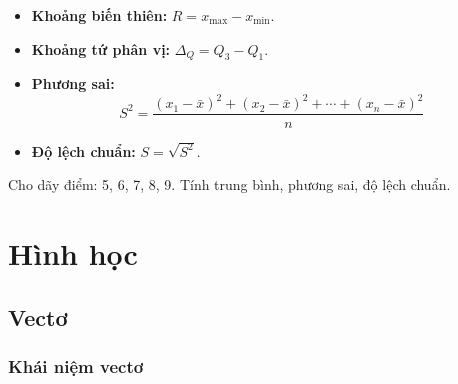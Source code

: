 \documentclass[12pt,a4paper]{article}
\begin{document}
\begin{congthuc}[title={Các số đặc trưng đo mức độ phân tán}]
  \begin{itemize}
    \item \textbf{Khoảng biến thiên:} $R = x_{\max} - x_{\min}$.
    \item \textbf{Khoảng tứ phân vị:} $\Delta_Q = Q_3 - Q_1$.
    \item \textbf{Phương sai:}
      \[
        S^2 = \dfrac{(x_1 - \bar{x})^2 + (x_2 - \bar{x})^2 + \cdots + (x_n - \bar{x})^2}{n}
      \]
    \item \textbf{Độ lệch chuẩn:} $S = \sqrt{S^2}$.
  \end{itemize}
\end{congthuc}

\begin{vidu}
  Cho dãy điểm: 5, 6, 7, 8, 9. Tính trung bình, phương sai, độ lệch chuẩn.
\end{vidu}

\section{Hình học}

\subsection{Vectơ}

\subsubsection{Khái niệm vectơ}
\end{document}
